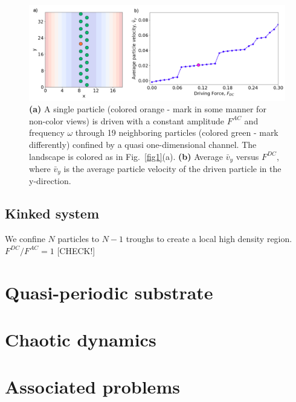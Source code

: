 \documentclass[twocolumn,preprintnumbers,amsmath,amssymb,aps,prx]{revtex4}
\begin{document}
\begin{center}
\begin{figure}[h!]
\centering
\includegraphics[width=\columnwidth]{twenty}
\caption{\textbf{(a)} A single particle (colored orange - mark in some manner for non-color views) is driven with a constant amplitude $F^{AC}$ and frequency $\omega$ through 19 neighboring particles (colored green - mark differently) confined by a quasi one-dimensional channel. The landscape is colored as in Fig.~\ref{fig1}(a). \textbf{(b)} Average $\bar{v}_{y}$ versus $F^{DC}$, where $\bar{v}_{y}$ is the average particle velocity of the driven particle in the y-direction.}
\label{fig:2}
\end{figure}
\end{center}

\subsection{Kinked system}
\label{sec:kink}	%
We confine $N$ particles to $N-1$ troughs to create a
local high density region.
$F^{DC}/F^{AC} = 1$ [CHECK!]



\section{Quasi-periodic substrate}
\label{sec:quasiperiod}	%

\section{Chaotic dynamics}
\label{sec:chaos}	%

\section{Associated problems}
\label{sec:problems}	%
\end{document}
